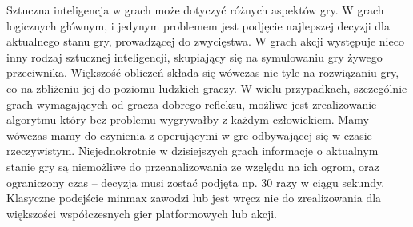 \begin{par}
Sztuczna inteligencja w grach może dotyczyć różnych aspektów gry. W grach logicznych głównym, i jedynym problemem jest podjęcie najlepszej decyzji dla aktualnego stanu gry, prowadzącej do zwycięstwa. 
W grach akcji występuje nieco inny rodzaj sztucznej inteligencji, skupiający się na symulowaniu gry żywego przeciwnika. 
Większość obliczeń składa się wówczas nie tyle na rozwiązaniu gry, co na zbliżeniu jej do poziomu ludzkich graczy. 
W wielu przypadkach, szczególnie grach wymagających od gracza dobrego refleksu, możliwe jest zrealizowanie algorytmu który bez problemu wygrywałby z każdym człowiekiem.
Mamy wówczas mamy do czynienia z operującymi w gre odbywającej się w czasie rzeczywistym. 
Niejednokrotnie w dzisiejszych grach informacje o aktualnym stanie gry są niemożliwe do przeanalizowania ze względu na ich ogrom, oraz ograniczony czas -- decyzja musi zostać podjęta np. 30 razy w ciągu sekundy. Klasyczne podejście minmax zawodzi lub jest wręcz nie do zrealizowania dla większości współczesnych gier platformowych lub akcji.
\end{par}
